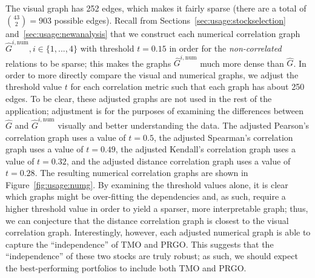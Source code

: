 The visual graph has 252 edges, which makes it fairly sparse (there are a total 
of ${43\choose 2} = 903$ possible edges). Recall from 
Sections~\ref{sec:usage:stockselection} and~\ref{sec:usage:newanalysis} that we 
construct each numerical correlation graph $\hat{G}^{i,\text{num}}, i\in 
\{1,...,4\}$ with threshold $t = 0.15$ in order for the \textit{non-correlated} 
relations to be sparse; this makes the graphs $\hat{G}^{i,\text{num}}$ much 
more dense than $\hat{G}$. 
In order to more directly compare the visual and numerical graphs, we adjust 
the threshold value $t$ for each correlation metric such that each graph has 
about 250 edges. To be clear, these adjusted graphs are not used in the rest of 
the application; adjustment is for the purposes of examining the differences 
between $\hat{G}$ and $\hat{G}^{i,\text{num}}$ visually and better 
understanding the data. 
The adjusted Pearson's correlation graph uses a value of $t = 0.5$, the 
adjusted Spearman's correlation graph uses a value of $t = 0.49$, the adjusted 
Kendall's correlation graph uses a value of $t = 0.32$, and the adjusted 
distance correlation graph uses a value of $t = 0.28$. 
The resulting numerical correlation graphs are shown in 
Figure~\ref{fig:usage:numg}. By examining the 
threshold values alone, it is clear which graphs might be over-fitting the 
dependencies and, as such, require a higher threshold value in order to yield a 
sparser, more interpretable graph; thus, we can conjecture that the distance 
correlation graph is closest to the visual correlation graph. Interestingly, 
however, each adjusted numerical graph is able to capture the ``independence'' 
of TMO and PRGO. This suggests that the ``independence'' of these two stocks 
are truly robust; as such, we should expect the best-performing portfolios to 
include both TMO and PRGO.


